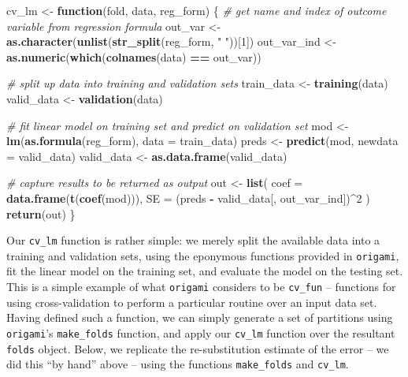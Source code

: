 \documentclass[12pt, krantz2,]{book}
\newenvironment{Shaded}{\begin{snugshade}}{\end{snugshade}}
\newcommand{\CommentTok}[1]{\textcolor[rgb]{0.56,0.35,0.01}{\textit{#1}}}
\newcommand{\ControlFlowTok}[1]{\textcolor[rgb]{0.13,0.29,0.53}{\textbf{#1}}}
\newcommand{\DataTypeTok}[1]{\textcolor[rgb]{0.13,0.29,0.53}{#1}}
\newcommand{\DecValTok}[1]{\textcolor[rgb]{0.00,0.00,0.81}{#1}}
\newcommand{\KeywordTok}[1]{\textcolor[rgb]{0.13,0.29,0.53}{\textbf{#1}}}
\newcommand{\NormalTok}[1]{#1}
\newcommand{\OperatorTok}[1]{\textcolor[rgb]{0.81,0.36,0.00}{\textbf{#1}}}
\newcommand{\StringTok}[1]{\textcolor[rgb]{0.31,0.60,0.02}{#1}}
\theoremstyle{definition}
\theoremstyle{definition}
\theoremstyle{definition}
\newcommand{\1}{\mathbbm{1}}
\begin{document}
\begin{Shaded}
\begin{Highlighting}[]
\NormalTok{cv_lm <-}\StringTok{ }\ControlFlowTok{function}\NormalTok{(fold, data, reg_form) \{}
  \CommentTok{# get name and index of outcome variable from regression formula}
\NormalTok{  out_var <-}\StringTok{ }\KeywordTok{as.character}\NormalTok{(}\KeywordTok{unlist}\NormalTok{(}\KeywordTok{str_split}\NormalTok{(reg_form, }\StringTok{" "}\NormalTok{))[}\DecValTok{1}\NormalTok{])}
\NormalTok{  out_var_ind <-}\StringTok{ }\KeywordTok{as.numeric}\NormalTok{(}\KeywordTok{which}\NormalTok{(}\KeywordTok{colnames}\NormalTok{(data) }\OperatorTok{==}\StringTok{ }\NormalTok{out_var))}

  \CommentTok{# split up data into training and validation sets}
\NormalTok{  train_data <-}\StringTok{ }\KeywordTok{training}\NormalTok{(data)}
\NormalTok{  valid_data <-}\StringTok{ }\KeywordTok{validation}\NormalTok{(data)}

  \CommentTok{# fit linear model on training set and predict on validation set}
\NormalTok{  mod <-}\StringTok{ }\KeywordTok{lm}\NormalTok{(}\KeywordTok{as.formula}\NormalTok{(reg_form), }\DataTypeTok{data =}\NormalTok{ train_data)}
\NormalTok{  preds <-}\StringTok{ }\KeywordTok{predict}\NormalTok{(mod, }\DataTypeTok{newdata =}\NormalTok{ valid_data)}
\NormalTok{  valid_data <-}\StringTok{ }\KeywordTok{as.data.frame}\NormalTok{(valid_data)}

  \CommentTok{# capture results to be returned as output}
\NormalTok{  out <-}\StringTok{ }\KeywordTok{list}\NormalTok{(}
    \DataTypeTok{coef =} \KeywordTok{data.frame}\NormalTok{(}\KeywordTok{t}\NormalTok{(}\KeywordTok{coef}\NormalTok{(mod))),}
    \DataTypeTok{SE =}\NormalTok{ (preds }\OperatorTok{-}\StringTok{ }\NormalTok{valid_data[, out_var_ind])}\OperatorTok{^}\DecValTok{2}
\NormalTok{  )}
  \KeywordTok{return}\NormalTok{(out)}
\NormalTok{\}}
\end{Highlighting}
\end{Shaded}

Our \texttt{cv\_lm} function is rather simple: we merely split the available data into a
training and validation sets, using the eponymous functions provided in
\texttt{origami}, fit the linear model on the training set, and evaluate the model on
the testing set. This is a simple example of what \texttt{origami} considers to be
\texttt{cv\_fun} -- functions for using cross-validation to perform a particular routine
over an input data set. Having defined such a function, we can simply generate a
set of partitions using \texttt{origami}'s \texttt{make\_folds} function, and apply our \texttt{cv\_lm}
function over the resultant \texttt{folds} object. Below, we replicate the
re-substitution estimate of the error -- we did this ``by hand'' above -- using
the functions \texttt{make\_folds} and \texttt{cv\_lm}.
\end{document}
